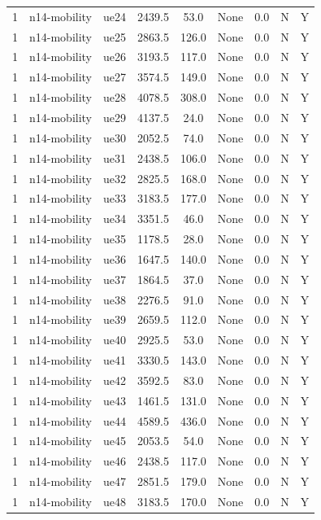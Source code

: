 \begin{table}[ht]
\begin{tabular}{|c|c|c|c|c|c|c|c|c|}
1 & n14-mobility & ue24 & 2439.5 & 53.0 & None & 0.0 & N & Y \\
1 & n14-mobility & ue25 & 2863.5 & 126.0 & None & 0.0 & N & Y \\
1 & n14-mobility & ue26 & 3193.5 & 117.0 & None & 0.0 & N & Y \\
1 & n14-mobility & ue27 & 3574.5 & 149.0 & None & 0.0 & N & Y \\
1 & n14-mobility & ue28 & 4078.5 & 308.0 & None & 0.0 & N & Y \\
1 & n14-mobility & ue29 & 4137.5 & 24.0 & None & 0.0 & N & Y \\
1 & n14-mobility & ue30 & 2052.5 & 74.0 & None & 0.0 & N & Y \\
1 & n14-mobility & ue31 & 2438.5 & 106.0 & None & 0.0 & N & Y \\
1 & n14-mobility & ue32 & 2825.5 & 168.0 & None & 0.0 & N & Y \\
1 & n14-mobility & ue33 & 3183.5 & 177.0 & None & 0.0 & N & Y \\
1 & n14-mobility & ue34 & 3351.5 & 46.0 & None & 0.0 & N & Y \\
1 & n14-mobility & ue35 & 1178.5 & 28.0 & None & 0.0 & N & Y \\
1 & n14-mobility & ue36 & 1647.5 & 140.0 & None & 0.0 & N & Y \\
1 & n14-mobility & ue37 & 1864.5 & 37.0 & None & 0.0 & N & Y \\
1 & n14-mobility & ue38 & 2276.5 & 91.0 & None & 0.0 & N & Y \\
1 & n14-mobility & ue39 & 2659.5 & 112.0 & None & 0.0 & N & Y \\
1 & n14-mobility & ue40 & 2925.5 & 53.0 & None & 0.0 & N & Y \\
1 & n14-mobility & ue41 & 3330.5 & 143.0 & None & 0.0 & N & Y \\
1 & n14-mobility & ue42 & 3592.5 & 83.0 & None & 0.0 & N & Y \\
1 & n14-mobility & ue43 & 1461.5 & 131.0 & None & 0.0 & N & Y \\
1 & n14-mobility & ue44 & 4589.5 & 436.0 & None & 0.0 & N & Y \\
1 & n14-mobility & ue45 & 2053.5 & 54.0 & None & 0.0 & N & Y \\
1 & n14-mobility & ue46 & 2438.5 & 117.0 & None & 0.0 & N & Y \\
1 & n14-mobility & ue47 & 2851.5 & 179.0 & None & 0.0 & N & Y \\
1 & n14-mobility & ue48 & 3183.5 & 170.0 & None & 0.0 & N & Y \\

\end{tabular}
\end{table}
